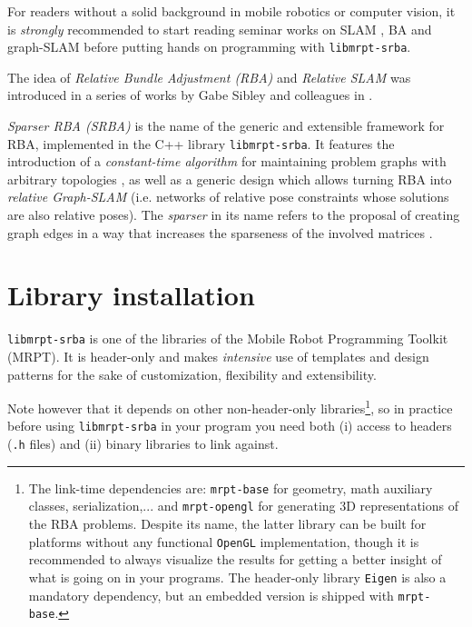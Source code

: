 \documentclass[a4paper,11pt]{article}
\begin{document}
For readers without a solid background in mobile robotics or computer vision, it is \emph{strongly} recommended 
to start reading seminar works on SLAM \cite{thrun2005pr,durrantwhyte2006sla,bailey2006sla}, 
BA \cite{triggs2000bundle} and graph-SLAM \cite{grisetti2010tgb} before putting hands on
programming with \texttt{libmrpt-srba}.

The idea of \emph{Relative Bundle Adjustment (RBA)} and \emph{Relative SLAM} was introduced in a series 
of works by Gabe Sibley and colleagues in \cite{sibley2009rba,sibley2009adaptive,mei2011rslam}. 

\emph{Sparser RBA (SRBA)} is the name of the generic and extensible framework for RBA, implemented in 
the C++ library \texttt{libmrpt-srba}. It features the introduction of 
a \emph{constant-time algorithm} for maintaining problem graphs with arbitrary topologies \cite{blanco2013srba}, 
as well as a generic design which allows turning RBA 
into \emph{relative Graph-SLAM} (i.e. networks of relative pose constraints whose solutions are also relative poses).
The \emph{sparser} in its name refers to the proposal of creating graph edges in a way that increases the sparseness 
of the involved matrices \cite{blanco2013srba}.

\newpage
\section{Library installation}

\texttt{libmrpt-srba} is one of the libraries of the Mobile Robot Programming Toolkit (MRPT). 
It is header-only and makes \emph{intensive} use of templates and design patterns for the sake of customization, 
flexibility and extensibility. 

Note however that it depends on other non-header-only libraries\footnote{The link-time dependencies are: \texttt{mrpt-base} 
for geometry, math auxiliary classes, serialization,... and \texttt{mrpt-opengl} for generating 3D representations of 
the RBA problems. Despite its name, the latter library can be built for platforms without any 
functional \texttt{OpenGL} implementation, though it is recommended to always visualize the results for getting a better 
insight of what is going on in your programs. The header-only library \texttt{Eigen} \cite{eigenweb} is also a mandatory dependency, but 
an embedded version is shipped with \texttt{mrpt-base}.}, 
so in practice before using \texttt{libmrpt-srba} in your program you need
both (i) access to headers (\texttt{.h} files) and (ii) binary libraries to link against. 
\end{document}
